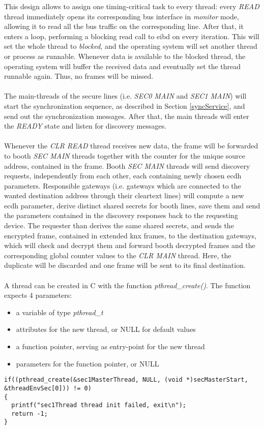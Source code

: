 This design allows to assign one timing-critical task to every thread: every \textit{READ} thread immediately opens its corresponding bus interface in \textit{monitor} mode, allowing it
to read all the bus traffic on the corresponding line. After that, it enters a loop, performing a blocking read call to \gls{eibd} on every iteration.
This will set the whole thread to \textit{blocked}, and the operating
system will set another thread or process as runnable. Whenever data is available to the blocked thread, the operating system will buffer the received data and eventually set the
thread runnable again. Thus, no frames will be missed.
\\
\\
The main-threads of the secure lines (i.e. \textit{SEC0 MAIN} and \textit{SEC1 MAIN}) will start the synchronization sequence, as described in Section \ref{syncService}, and send out
the synchronization messages. After  that, the main threads will enter the \textit{READY} state and listen for discovery messages.
\\
\\
Whenever the \textit{CLR READ} thread receives new data, the frame will be forwarded to booth \textit{SEC MAIN} threads together with the counter for the unique source address, contained
in the frame. Booth \textit{SEC MAIN} threads will send discovery requests, independently from each other, each containing newly chosen \gls{ecdh} parameters. Responsible gateways (i.e.
gateways which are connected to the wanted destination address through their cleartext lines) will compute a new \gls{ecdh} parameter, derive distinct shared secrets for booth lines,
save them and send the parameters contained in the discovery responses back to the requesting device. The requester than derives the same shared secrets, and sends the encrypted frame,
contained in extended \gls{knx} frames, to the destination gateways, which will check and decrypt them and forward booth decrypted frames and the corresponding global counter values
to the \textit{CLR MAIN} thread. Here, the duplicate will be discarded and one frame will be sent to its final destination.
\\
\\
A thread can be created in C with the function \textit{pthread\_create()}. The function expects 4 parameters:
\begin{itemize}
 \item a variable of type \textit{pthread\_t}
 \item attributes for the new thread, or NULL for default values
 \item a function pointer, serving as entry-point for the new thread
 \item parameters for the function pointer, or NULL
\end{itemize}
\begin{lstlisting}[style=cStyle,caption={Thread-creation},label=lst:pthread_create]
if((pthread_create(&sec1MasterThread, NULL, (void *)secMasterStart, &threadEnvSec[0])) != 0)
{
  printf("sec1Thread thread init failed, exit\n");
  return -1;
}
\end{lstlisting}


